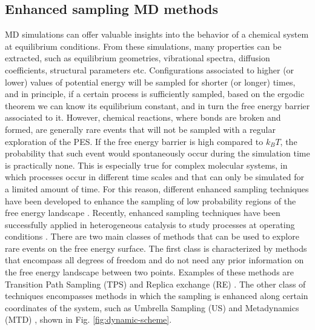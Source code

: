 \subsection*{Enhanced sampling MD methods}
MD simulations can offer valuable insights into the behavior of a chemical system at equilibrium conditions. From these simulations, many properties can be extracted, such as equilibrium geometries, vibrational spectra, diffusion coefficients, structural parameters etc. Configurations associated to higher (or lower) values of potential energy will be sampled for shorter (or longer) times, and in principle, if a certain process is sufficiently sampled, based on the ergodic theorem we can know its equilibrium constant, and in turn the free energy barrier associated to it. However, chemical reactions, where bonds are broken and formed, are generally rare events that will not be sampled with a regular exploration of the PES. If the free energy barrier is high compared to $k_{B}T$, the probability that such event would spontaneously occur during the simulation time is practically none. This is especially true for complex molecular systems, in which processes occur in different time scales and that can only be simulated for a limited amount of time. For this reason, different enhanced sampling techniques have been developed to enhance the sampling of low probability regions of the free energy landscape \cite{valsson2016enhancing, laio2002escaping, sutto2012new, carter1989constrained, darve2001calculating, jarzynski1997nonequilibrium, rosso2002use, gullingsrud1999reconstructing}. Recently, enhanced sampling techniques have been successfully applied in heterogeneous catalysis to study processes at operating conditions \cite{dewispelaere2016insight, dewispelaere2015complex, vanspeybroeck2014first, cnudde2017effect, haigis2015hydrothermal, buvcko2011monomolecular, fraux2017recent}.
\npar
There are two main classes of methods that can be used to explore rare events on the free energy surface. The first class is characterized by methods that encompass all degrees of freedom and do not need any prior information on the free energy landscape between two points. Examples of these methods are Transition Path Sampling (TPS) \cite{dellago2002transition} and Replica exchange (RE) \cite{sugita1999replica}. The other class of techniques encompasses methods in which the sampling is enhanced along certain coordinates of the system, such as Umbrella Sampling (US) \cite{torrie1977nonphysical, patey1975monte} and Metadynamics (MTD) \cite{laio2002escaping}, shown in Fig. \ref{fig:dynamic-scheme}.

